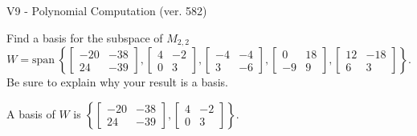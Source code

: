 \begin{exercise}
  \begin{exerciseTitle}V9 - Polynomial Computation (ver. 582)\end{exerciseTitle}
  \begin{exerciseStatement}
    Find a basis for the subspace of \(M_{2,2}\) 
\[W=\mathrm{span}\ \left\{\left[\begin{array}{cc}
-20 & -38 \\
24 & -39
\end{array}\right] , \left[\begin{array}{cc}
4 & -2 \\
0 & 3
\end{array}\right] , \left[\begin{array}{cc}
-4 & -4 \\
3 & -6
\end{array}\right] , \left[\begin{array}{cc}
0 & 18 \\
-9 & 9
\end{array}\right] , \left[\begin{array}{cc}
12 & -18 \\
6 & 3
\end{array}\right]\right\}.\]
 Be sure to explain why your result is a basis.


  \end{exerciseStatement}
  \begin{exerciseAnswer}
   A basis of \(W\) is  \(\left\{\left[\begin{array}{cc}
-20 & -38 \\
24 & -39
\end{array}\right] , \left[\begin{array}{cc}
4 & -2 \\
0 & 3
\end{array}\right]\right\}\).
  


  \end{exerciseAnswer}
\end{exercise}